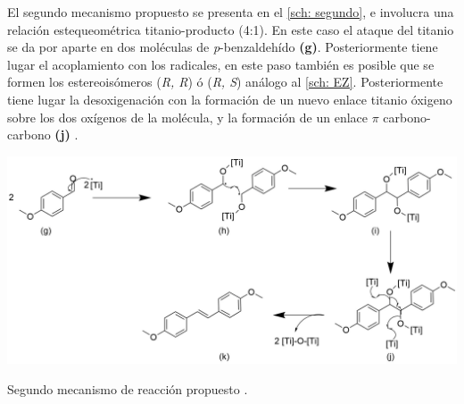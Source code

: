 \documentclass[fleqn,11pt]{SelfArx}
\begin{document}
El segundo mecanismo propuesto se presenta en el \autoref{sch: segundo}, e involucra una relaci\'on estequeom\'etrica titanio-producto (4:1). En este caso el ataque del titanio se da por aparte en dos mol\'eculas de \textit{p}-benzaldeh\'ido \textbf{(g)}. Posteriormente tiene lugar el acoplamiento con los radicales, en este paso tambi\'en es posible que se formen los estereois\'omeros (\textit{R, R}) \'o (\textit{R, S}) an\'alogo al \autoref{sch: EZ}. Posteriormente tiene lugar la desoxigenaci\'on con la formaci\'on de un nuevo enlace titanio \'oxigeno sobre los dos ox\'igenos de la mol\'ecula, y la formaci\'on de un enlace $\pi$ carbono-carbono \textbf{(j)} \cite{Wang2010}.
\begin{scheme}[h]
	\centering
	\includegraphics[width = \linewidth]{structures/mechanism2.png}
	\caption{Segundo mecanismo de reacci\'on propuesto \cite{Wang2010}.}
	\label{sch: segundo}
\end{scheme}
\end{document}

